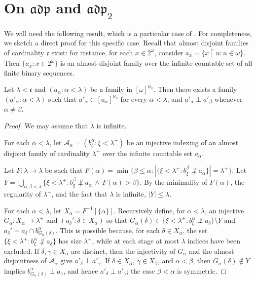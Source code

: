 \section{On $\mathfrak{adp}$ and $\mathfrak{adp}_2$}\label{sec:adp}

We will need the following result, which is a particular case of \cite[Theorem 2.1]{zbMATH03494419}.
For completeness, we sketch a direct proof for this specific case. Recall that almost disjoint families of cardinality $\mathfrak c$ exist: for instance, for each $x \in 2^\omega$, consider $a_x=\{x\restriction n: n \in \omega\}$.
Then $\{a_x: x \in 2^{\omega}\}$ is an almost disjoint family over the infinite countable set of all finite binary sequences.

\begin{thm}\label{maintool}
    Let $\lambda<\mathfrak c$ and $(a_\alpha: \alpha<\lambda)$ be a family in $[\omega]^{\aleph_0}$.
    Then there exists a family $(a'_\alpha: \alpha<\lambda)$ such that $a'_\alpha\in[a_\alpha]^{\aleph_0}$ for every $\alpha<\lambda$, and $a'_\alpha\perp a'_\beta$ whenever $\alpha\neq\beta$.
\end{thm}

\begin{proof}
    We may assume that $\lambda$ is infinite.
    
    For each $\alpha<\lambda$, let $\mathcal A_\alpha=(b^\alpha_\xi: \xi<\lambda^+)$ be an injective indexing of an almost disjoint family of cardinality $\lambda^+$ over the infinite countable set $a_\alpha$.

    Let $F:\lambda \rightarrow \lambda$ be such that $F(\alpha)=\min\{\beta\leq \alpha: |\{\xi<\lambda^+: b^\beta_\xi\not\perp a_\alpha\}|=\lambda^+\}$. Let $Y=\bigcup_{\alpha, \beta<\lambda}\{\xi<\lambda^+: b_\xi^\beta\not\perp a_\alpha\,\wedge\, F(\alpha)>\beta\}$. By the minimality of $F(\alpha)$, the regularity of $\lambda^+$, and the fact that $\lambda$ is infinite, $|Y|\leq \lambda$.
    
    For each $\alpha<\lambda$, let $X_\alpha=F^{-1}[\{\alpha\}]$. Recursively define, for $\alpha<\lambda$, an injective $G_\alpha: X_\alpha\rightarrow \lambda^+$ and $(a_\delta': \delta\in X_\alpha)$ so that $G_\alpha(\delta)\in \{\xi<\lambda^+: b_\xi^\alpha\not \perp a_\delta\}\setminus Y$ and $a_\delta'=a_\delta\cap b^{\alpha}_{G_\alpha(\delta)}$.
    This is possible because, for each $\delta\in X_\alpha$, the set $\{\xi<\lambda^+: b_\xi^\alpha\not \perp a_\delta\}$ has size $\lambda^+$, while at each stage at most $\lambda$ indices have been excluded.
    If $\delta,\gamma\in X_\alpha$ are distinct, then the injectivity of $G_\alpha$ and the almost disjointness of $\mathcal A_\alpha$ give $a'_\delta\perp a'_\gamma$.
    If $\delta\in X_\alpha$, $\gamma\in X_\beta$, and $\alpha<\beta$, then $G_\alpha(\delta)\notin Y$ implies $b^\alpha_{G_\alpha(\delta)}\perp a_\gamma$, and hence $a'_\delta\perp a'_\gamma$; the case $\beta<\alpha$ is symmetric.
\end{proof}

